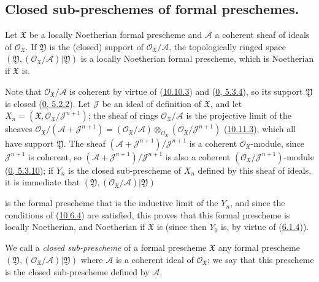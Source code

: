 \subsection{Closed sub-preschemes of formal preschemes.}
\label{subsection:I.10.14}

\begin{proposition}[10.14.1]
\label{I.10.14.1}
Let $\mathfrak{X}$ be a locally Noetherian formal prescheme and
$\mathscr{A}$ a coherent sheaf of ideals of
$\mathscr{O}_{\mathfrak{X}}$. If $\mathfrak{Y}$ is the (closed) support of
$\mathscr{O}_{\mathfrak{X}}/\mathscr{A}$, the topologically ringed space
$(\mathfrak{Y},(\mathscr{O}_{\mathfrak{X}}/\mathscr{A})|\mathfrak{Y})$ is
a locally Noetherian formal prescheme, which is Noetherian if
$\mathfrak{X}$ is.
\end{proposition}

Note that $\mathscr{O}_{\mathfrak{X}}/\mathscr{A}$ is coherent by virtue of
(\hyperref[I.10.10.3]{10.10.3}) and
(\hyperref[0.5.3.4]{0, 5.3.4}), so its support $\mathfrak{Y}$ is closed
(\hyperref[0.5.2.2]{0, 5.2.2}). Let $\mathscr{J}$ be an ideal of definition
of $\mathfrak{X}$, and let
$X_n=(\mathfrak{X},\mathscr{O}_{\mathfrak{X}}/\mathscr{J}^{n+1})$; the
sheaf of rings $\mathscr{O}_{\mathfrak{X}}/\mathscr{A}$ is the projective
limit of the sheaves
$\mathscr{O}_{\mathfrak{X}}/(\mathscr{A}+\mathscr{J}^{n+1})
=(\mathscr{O}_{\mathfrak{X}}/\mathscr{A})
\otimes_{\mathscr{O}_{\mathfrak{X}}}
(\mathscr{O}_{\mathfrak{X}}/\mathscr{J}^{n+1})$
(\hyperref[I.10.11.3]{10.11.3}), which all have support
$\mathfrak{Y}$. The sheaf
$(\mathscr{A}+\mathscr{J}^{n+1})/\mathscr{J}^{n+1}$ is a
coherent $\mathscr{O}_{\mathfrak{X}}$-module, since
$\mathscr{J}^{n+1}$ is coherent, so
$(\mathscr{A}+\mathscr{J}^{n+1})/\mathscr{J}^{n+1}$ is also a
coherent $(\mathscr{O}_{\mathfrak{X}}/\mathscr{J}^{n+1})$-module
(\hyperref[0.5.3.10]{0, 5.3.10}); if $Y_n$ is the closed sub-prescheme
of $X_n$ defined by this sheaf of ideals, it is immediate that
$(\mathfrak{Y},(\mathscr{O}_{\mathfrak{X}}/\mathscr{A})|\mathfrak{Y})$

is the formal prescheme that is the inductive limit of the $Y_n$, and since
the conditions of (\hyperref[I.10.6.4]{10.6.4}) are satisfied, this proves
that this formal prescheme is locally Noetherian, and Noetherian if
$\mathfrak{X}$ is (since then $Y_0$ is, by virtue of
(\hyperref[I.6.1.4]{6.1.4})).

\begin{definition}[10.14.2]
\label{I.10.14.2}
We call a \emph{closed sub-prescheme} of a formal prescheme $\mathfrak{X}$
any formal prescheme
$(\mathfrak{Y},(\mathscr{O}_{\mathfrak{X}}/\mathscr{A})|\mathfrak{Y})$ where
$\mathscr{A}$ is a coherent ideal of $\mathscr{O}_{\mathfrak{X}}$; we say that
this prescheme is the closed sub-prescheme defined by $\mathscr{A}$.
\end{definition}


